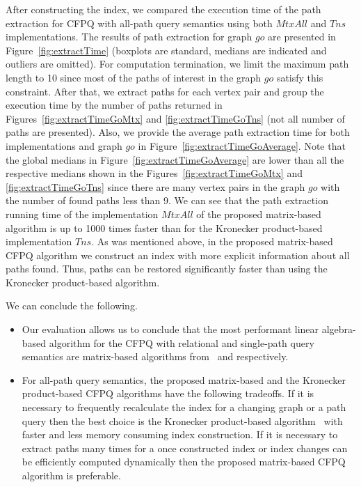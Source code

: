 After constructing the index, we compared the execution time of the path extraction for CFPQ with all-path query semantics using both $MtxAll$ and $Tns$ implementations. The results of path extraction for graph $go$ are presented in Figure~\ref{fig:extractTime} (boxplots are standard, medians are indicated and outliers are omitted). For computation termination, we limit the maximum path length to 10 since most of the paths of interest in the graph $go$ satisfy this constraint. After that, we extract paths for each vertex pair and group the execution time by the number of paths returned in Figures~\ref{fig:extractTimeGoMtx} and \ref{fig:extractTimeGoTns} (not all number of paths are presented). Also, we provide the average path extraction time for both implementations and graph $go$ in Figure~\ref{fig:extractTimeGoAverage}. Note that the global medians in Figure~\ref{fig:extractTimeGoAverage} are lower than all the respective medians shown in the Figures~\ref{fig:extractTimeGoMtx} and \ref{fig:extractTimeGoTns} since there are many vertex pairs in the graph $go$ with the number of found paths less than 9. We can see that the path extraction running time of the implementation $MtxAll$ of the proposed matrix-based algorithm is up to 1000 times faster than for the Kronecker product-based implementation $Tns$. As was mentioned above, in the proposed matrix-based CFPQ algorithm we construct an index with more explicit information about all paths found. Thus, paths can be restored significantly faster than using the Kronecker product-based algorithm.

We can conclude the following.
\begin{itemize}
	\item Our evaluation allows us to conclude that the most performant linear algebra-based algorithm for the CFPQ with relational and single-path query semantics are matrix-based algorithms from~\cite{Azimov:2018:CPQ:3210259.3210264} and \cite{10.1145/3398682.3399163} respectively.
	\item For all-path query semantics, the proposed matrix-based and the Kronecker product-based CFPQ algorithms have the following tradeoffs. If it is necessary to frequently recalculate the index for a changing graph or a path query then the best choice is the Kronecker product-based algorithm~\cite{kron} with faster and less memory consuming index construction. If it is necessary to extract paths many times for a once constructed index or index changes can be efficiently computed dynamically then the proposed matrix-based CFPQ algorithm is preferable.
\end{itemize}



